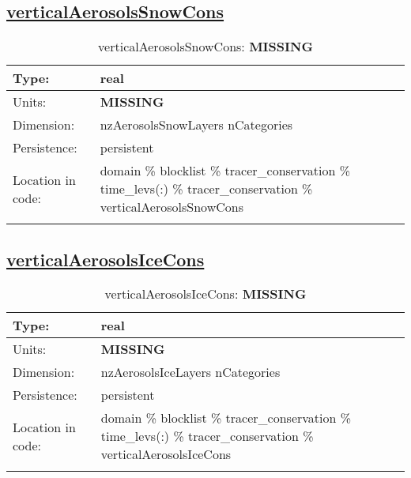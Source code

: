 \subsection[verticalAerosolsSnowCons]{\hyperref[sec:var_tab_tracer_conservation]{verticalAerosolsSnowCons}}
\label{subsec:var_sec_tracer_conservation_verticalAerosolsSnowCons}
\begin{center}
\begin{longtable}{| p{2.0in} | p{4.0in} |}
        \hline 
        Type: & real \\
        \hline 
        Units: & {\bf \color{red} MISSING} \\
        \hline 
        Dimension: & nzAerosolsSnowLayers nCategories \\
        \hline 
        Persistence: & persistent \\
        \hline 
         Location in code: & domain \% blocklist \% tracer\_conservation \% time\_levs(:) \% tracer\_conservation \% verticalAerosolsSnowCons \\
         \hline 
    \caption{verticalAerosolsSnowCons: {\bf \color{red} MISSING}}
\end{longtable}
\end{center}
\subsection[verticalAerosolsIceCons]{\hyperref[sec:var_tab_tracer_conservation]{verticalAerosolsIceCons}}
\label{subsec:var_sec_tracer_conservation_verticalAerosolsIceCons}
\begin{center}
\begin{longtable}{| p{2.0in} | p{4.0in} |}
        \hline 
        Type: & real \\
        \hline 
        Units: & {\bf \color{red} MISSING} \\
        \hline 
        Dimension: & nzAerosolsIceLayers nCategories \\
        \hline 
        Persistence: & persistent \\
        \hline 
         Location in code: & domain \% blocklist \% tracer\_conservation \% time\_levs(:) \% tracer\_conservation \% verticalAerosolsIceCons \\
         \hline 
    \caption{verticalAerosolsIceCons: {\bf \color{red} MISSING}}
\end{longtable}
\end{center}
